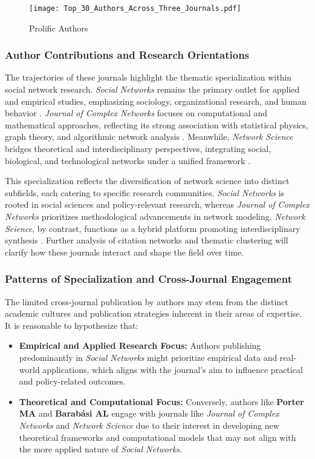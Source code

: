 \documentclass[twocolumn]{article}
\begin{document}
	\begin{figure*}[htbp]
		\centering
		\texttt{[image: Top\_30\_Authors\_Across\_Three\_Journals.pdf]}
		\caption{Prolific Authors}
		\label{fig.fig2}
	\end{figure*}
	
	\subsubsection*{Author Contributions and Research Orientations}
	
The trajectories of these journals highlight the thematic specialization within social network research. \textit{Social Networks} remains the primary outlet for applied and empirical studies, emphasizing sociology, organizational research, and human behavior \cite{Marin2011,Freeman2004}. \textit{Journal of Complex Networks} focuses on computational and mathematical approaches, reflecting its strong association with statistical physics, graph theory, and algorithmic network analysis \cite{Newman2010,Fortunato2010}. Meanwhile, \textit{Network Science} bridges theoretical and interdisciplinary perspectives, integrating social, biological, and technological networks under a unified framework \cite{Barabasi2022,Boccaletti2006}.

This specialization reflects the diversification of network science into distinct subfields, each catering to specific research communities. \textit{Social Networks} is rooted in social sciences and policy-relevant research, whereas \textit{Journal of Complex Networks} prioritizes methodological advancements in network modeling. \textit{Network Science}, by contrast, functions as a hybrid platform promoting interdisciplinary synthesis \cite{Lazer2009,Borner2020}. Further analysis of citation networks and thematic clustering will clarify how these journals interact and shape the field over time.

	
	\subsubsection*{Patterns of Specialization and Cross-Journal Engagement}
	
	The limited cross-journal publication by authors may stem from the distinct academic cultures and publication strategies inherent in their areas of expertise. It is reasonable to hypothesize that:
	\begin{itemize}
		\item \textbf{Empirical and Applied Research Focus:} Authors publishing predominantly in \textit{Social Networks} might prioritize empirical data and real-world applications, which aligns with the journal's aim to influence practical and policy-related outcomes.
		\item \textbf{Theoretical and Computational Focus:} Conversely, authors like \textbf{Porter MA} and \textbf{Barabási AL} engage with journals like \textit{Journal of Complex Networks} and \textit{Network Science} due to their interest in developing new theoretical frameworks and computational models that may not align with the more applied nature of \textit{Social Networks}.
	\end{itemize}
	
\end{document}
